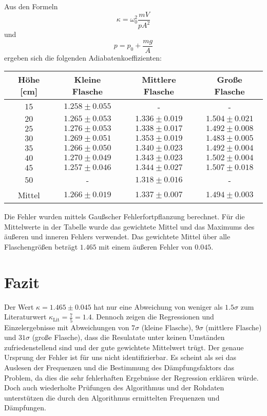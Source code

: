 \documentclass[a4paper, 12pt]{scrartcl}
\begin{document}
Aus den Formeln
\begin{equation*}
\kappa = \omega_0^2 \frac{mV}{pA^2}
\end{equation*}
und 
\begin{equation*}
p = p_0 + \frac{mg}{A}
\end{equation*}
ergeben sich die folgenden Adiabatenkoeffizienten:
\begin{table}[H]
\centering
\begin{tabular}{c|ccc}
Höhe [cm] & Kleine Flasche & Mittlere Flasche & Große Flasche \\
\hline
$15$ & $1.258\pm 0.055$ & - & - \\
$20$ & $1.265\pm 0.053$ & $1.336\pm 0.019$ & $1.504\pm 0.021$ \\
$25$ & $1.276\pm 0.053$ & $1.338\pm 0.017$ & $1.492\pm 0.008$ \\
$30$ & $1.269\pm 0.051$ & $1.353\pm 0.019$ & $1.483\pm 0.005$ \\
$35$ & $1.266\pm 0.050$ & $1.340\pm 0.023$ & $1.492\pm 0.004$ \\
$40$ & $1.270\pm 0.049$ & $1.343\pm 0.023$ & $1.502\pm 0.004$ \\
$45$ & $1.257\pm 0.046$ & $1.344\pm 0.027$ & $1.507\pm 0.018$ \\
$50$ & - & $1.318\pm 0.016$ & - \\
\hline
Mittel & $1.266\pm 0.019$ & $1.337\pm 0.007$ & $1.494\pm 0.003$
\end{tabular}
\end{table}	
Die Fehler wurden mittels Gaußscher Fehlerfortpflanzung berechnet. Für die Mittelwerte in der Tabelle wurde das gewichtete Mittel und das Maximums des äußeren und inneren Fehlers verwendet.
Das gewichtete Mittel über alle Flaschengrößen beträgt $1.465$ mit einem äußeren Fehler von $0.045$.

\section{Fazit}
Der Wert $\kappa = 1.465\pm 0.045$ hat nur eine Abweichung von weniger als $1.5\sigma$ zum Literaturwert $\kappa_{\text{Lit}} = \frac{7}{5} =1.4$. Dennoch zeigen die Regressionen und Einzelergebnisse mit Abweichungen von $7\sigma$ (kleine Flasche), $9\sigma$ (mittlere Flasche) und $31\sigma$ (große Flasche), dass die Resulatate unter keinen Umständen zufriedenstellend sind und der gute gewichtete Mittelwert trügt. Der genaue Ursprung der Fehler ist für uns nicht identifizierbar. Es scheint als sei das Auslesen der Frequenzen und die Bestimmung des Dämpfungsfaktors das Problem, da dies die sehr fehlerhaften Ergebnisse der Regression erklären würde. Doch auch wiederholte Prüfungen des Algorithmus und der Rohdaten unterstützen die durch den Algorithmus ermittelten Frequenzen und Dämpfungen. 
\end{document}
